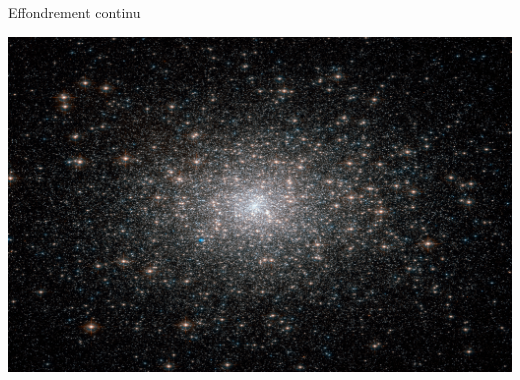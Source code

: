 \documentclass[slidetop,12pt,ucs]{beamer}
\renewcommand{\(}{\ensuremath{\left(}}
\renewcommand{\)}{\ensuremath{\right)}}
\begin{document}
\begin{frame}[t]{Effondrement continu}
\begin{minipage}{.5\linewidth}
					\end{minipage}\hfill
					\begin{minipage}{.5\linewidth}
						\centering \includegraphics[width=0.7\linewidth]{graphe/m15_hst_4089_HD-2.png}
					\end{minipage}
			\end{frame}
\end{document}
